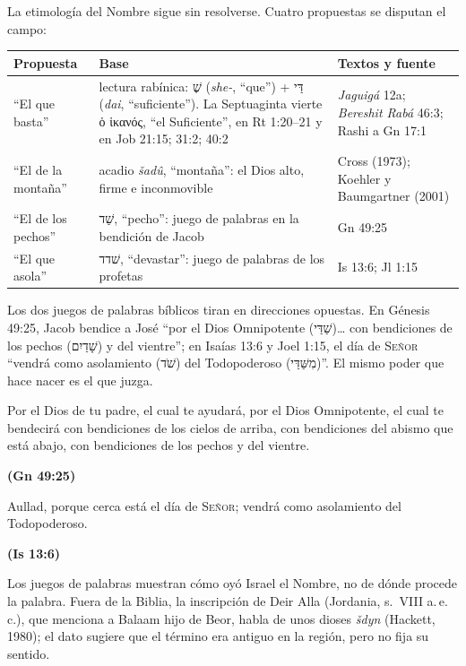 \documentclass[11pt,letterpaper]{article}
\newcommand{\heb}[1]{\mbox{\foreignlanguage{hebrew}{#1}}}
\newcommand{\grc}[1]{\foreignlanguage{ancientgreek}{#1}}
\newcommand{\SENOR}{\textsc{Señor}}
\newcommand{\fuente}[1]{\par\hfill{\upshape\bfseries\small\textcolor{azul}{#1}}}
\begin{document}
La etimología del Nombre sigue sin resolverse. Cuatro propuestas se disputan el campo:

\begin{center}\small\renewcommand{\arraystretch}{1.25}
\begin{tabular}{@{}L{3.0cm}L{6.4cm}L{5.0cm}@{}}
\toprule
\textbf{Propuesta} & \textbf{Base} & \textbf{Textos y fuente} \\ \midrule
``El que basta'' & lectura rabínica: \heb{שֶׁ} (\emph{she-}, ``que'') + \heb{דַּי} (\emph{dai}, ``suficiente''). La Septuaginta vierte \grc{ὁ ἱκανός}, ``el Suficiente'', en Rt 1:20--21 y en Job 21:15; 31:2; 40:2 & \emph{Jaguigá} 12a; \emph{Bereshit Rabá} 46:3; Rashi a Gn 17:1 \\
``El de la montaña'' & acadio \emph{šadû}, ``montaña'': el Dios alto, firme e inconmovible & Cross (1973); Koehler y Baumgartner (2001) \\
``El de los pechos'' & \heb{שַׁד}, ``pecho'': juego de palabras en la bendición de Jacob & Gn 49:25 \\
``El que asola'' & \heb{שׁדד}, ``devastar'': juego de palabras de los profetas & Is 13:6; Jl 1:15 \\
\bottomrule
\end{tabular}\end{center}

Los dos juegos de palabras bíblicos tiran en direcciones opuestas. En Génesis 49:25, Jacob bendice a José ``por el Dios Omnipotente (\heb{שַׁדַּי})\ldots{} con bendiciones de los pechos (\heb{שָׁדַיִם}) y del vientre''; en Isaías 13:6 y Joel 1:15, el día de \SENOR{} ``vendrá como asolamiento (\heb{שֹׁד}) del Todopoderoso (\heb{מִשַּׁדַּי})''. El mismo poder que hace nacer es el que juzga.

\begin{cita}Por el Dios de tu padre, el cual te ayudará, por el Dios Omnipotente, el cual te bendecirá con bendiciones de los cielos de arriba, con bendiciones del abismo que está abajo, con bendiciones de los pechos y del vientre.\fuente{(Gn 49:25)}\end{cita}

\begin{cita}Aullad, porque cerca está el día de \SENOR; vendrá como asolamiento del Todopoderoso.\fuente{(Is 13:6)}\end{cita}

\begin{nota}[Precisión]
Los juegos de palabras muestran cómo oyó Israel el Nombre, no de dónde procede la palabra. Fuera de la Biblia, la inscripción de Deir Alla (Jordania, s.~VIII a.\,e.\,c.), que menciona a Balaam hijo de Beor, habla de unos dioses \emph{šdyn} (Hackett, 1980); el dato sugiere que el término era antiguo en la región, pero no fija su sentido.
\end{nota}
\end{document}
